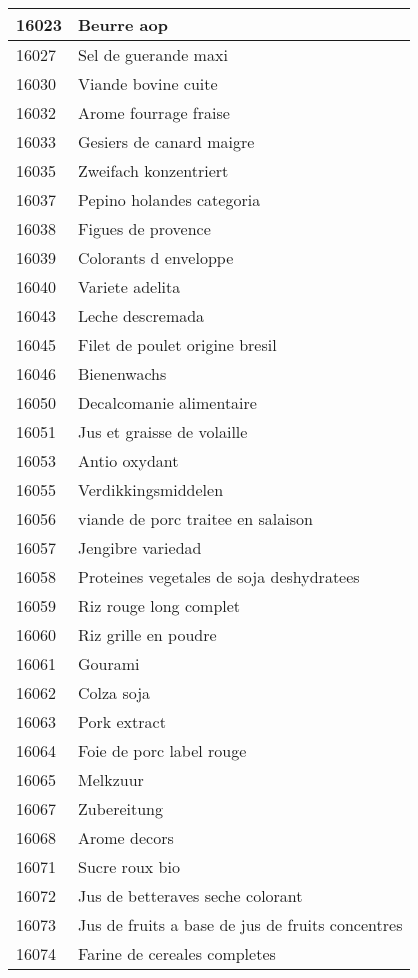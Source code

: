 \begin{longtable}{|l|l|}
16023 & Beurre aop \\ \hline 
16027 & Sel de guerande maxi \\ \hline 
16030 & Viande bovine cuite \\ \hline 
16032 & Arome fourrage fraise \\ \hline 
16033 & Gesiers de canard maigre \\ \hline 
16035 & Zweifach konzentriert \\ \hline 
16037 & Pepino holandes categoria \\ \hline 
16038 & Figues de provence \\ \hline 
16039 & Colorants d enveloppe \\ \hline 
16040 & Variete adelita \\ \hline 
16043 & Leche descremada \\ \hline 
16045 & Filet de poulet origine bresil \\ \hline 
16046 & Bienenwachs \\ \hline 
16050 & Decalcomanie alimentaire \\ \hline 
16051 & Jus et graisse de volaille \\ \hline 
16053 & Antio oxydant \\ \hline 
16055 & Verdikkingsmiddelen \\ \hline 
16056 & viande de porc traitee en salaison \\ \hline 
16057 & Jengibre variedad \\ \hline 
16058 & Proteines vegetales de soja deshydratees \\ \hline 
16059 & Riz rouge long complet \\ \hline 
16060 & Riz grille en poudre \\ \hline 
16061 & Gourami \\ \hline 
16062 & Colza soja \\ \hline 
16063 & Pork extract \\ \hline 
16064 & Foie de porc label rouge \\ \hline 
16065 & Melkzuur \\ \hline 
16067 & Zubereitung \\ \hline 
16068 & Arome decors \\ \hline 
16071 & Sucre roux bio \\ \hline 
16072 & Jus de betteraves seche colorant \\ \hline 
16073 & Jus de fruits a base de jus de fruits concentres \\ \hline 
16074 & Farine de cereales completes \\ \hline 

\end{longtable}

